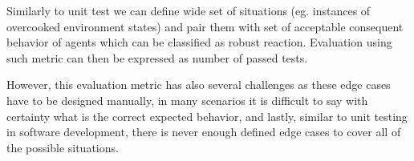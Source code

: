 Similarly to unit test we can define wide set of situations (eg. instances of overcooked environment states) and pair them with set of acceptable consequent behavior of agents which can be classified as robust reaction.
Evaluation using such metric can then be expressed as number of passed tests.

However, this evaluation metric has also several challenges as these edge cases have to be designed manually, in many scenarios it is difficult to say with certainty what is the correct expected behavior, and lastly, similar to unit testing in software development, there is never enough defined edge cases to cover all of the possible situations.